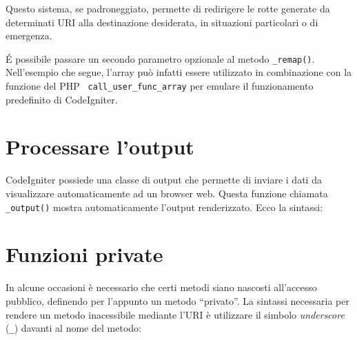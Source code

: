 Questo sistema, se padroneggiato, permette di redirigere le rotte generate da determinati \ac{URI} alla destinazione desiderata, in situazioni particolari o di emergenza.

\'E possibile passare un secondo parametro opzionale al metodo \verb|_remap()|. Nell'esempio che segue, l'array può infatti essere utilizzato in combinazione con la funzione del \ac{PHP} \verb| call_user_func_array| per emulare il funzionamento predefinito di CodeIgniter.


\section{Processare l'output}
CodeIgniter possiede una classe di output che permette di inviare i dati da visualizzare automaticamente ad un browser web. Questa funzione chiamata \verb|_output()| mostra automaticamente l'output renderizzato. Ecco la sintassi:


%

\section{Funzioni private}
In alcune occasioni è necessario che certi metodi siano nascosti all'accesso pubblico, definendo per l'appunto un metodo ``privato''. La sintassi necessaria per rendere un metodo inacessibile mediante l'\ac{URI} è utilizzare il simbolo \emph{underscore} (\verb|_|) davanti al nome del metodo:

